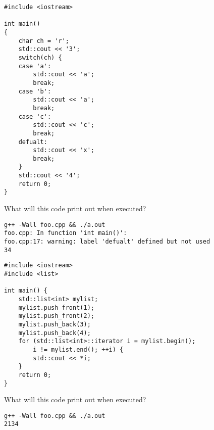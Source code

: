 \documentclass[landscape]{slides}
\begin{document}
\begin{slide}
\begin{lstlisting}
#include <iostream>

int main() 
{
    char ch = 'r';
    std::cout << '3';
    switch(ch) {
    case 'a':
        std::cout << 'a';
        break;
    case 'b':
        std::cout << 'a';
        break;
    case 'c':
        std::cout << 'c';
        break;
    defualt:
        std::cout << 'x';
        break;
    }
    std::cout << '4';
    return 0;
}
\end{lstlisting}

What will this code print out when executed?

\begin{note}
\begin{tiny}
\begin{verbatim}
g++ -Wall foo.cpp && ./a.out
foo.cpp: In function 'int main()':
foo.cpp:17: warning: label 'defualt' defined but not used
34
\end{verbatim}
\end{tiny}
\end{note}
\end{slide}


\begin{slide}
\begin{lstlisting}
#include <iostream>
#include <list>

int main() {
    std::list<int> mylist;
    mylist.push_front(1);
    mylist.push_front(2);
    mylist.push_back(3);
    mylist.push_back(4);
    for (std::list<int>::iterator i = mylist.begin();
        i != mylist.end(); ++i) {
        std::cout << *i;
    }
    return 0;
}
\end{lstlisting}

What will this code print out when executed?

\begin{note}
\begin{tiny}
\begin{verbatim}
g++ -Wall foo.cpp && ./a.out
2134
\end{verbatim}
\end{tiny}
\end{note}
\end{slide}

\end{document}
